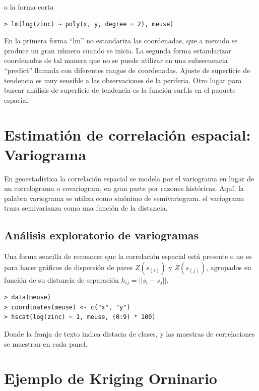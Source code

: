 o la forma corta
\\
\begin{lstlisting}
> lm(log(zinc) ~ poly(x, y, degree = 2), meuse)
\end{lstlisting}

En la primera forma ``lm'' no estandariza las coordenadas, que a menudo se produce un gran número cuando se inicia. La 
segunda forma estandarizar coordenadas de tal manera que no se puede utilizar en una subsecuencia ``predict'' llamada 
con diferentes rangos de coordenadas. Ajuste de superficie de tendencia es muy sensible a las observaciones 
de la periferia. Otro lugar para buscar análisis de superficie de tendencia es la función surf.ls en el paquete espacial.

\section{Estimatión de correlación espacial: Variograma}

En geoestadística la correlación espacial se modela por el variograma en lugar de
un correlograma o covariogram, en gran parte por razones históricas. Aquí, la palabra
variograma se utiliza como sinónimo de semivariogram. el variograma traza semivarianza como una función de la distancia.

\subsection{Análisis exploratorio de variogramas}

Una forma sencilla de reconocer que la correlación espacial está presente o no es
para hacer gráficos de dispersión de pares $Z(s_{(i)})$ y $Z(s_{(j)})$, agrupados en función de su
distancia de separación $h_{ij} = || s_i - s_j ||$.
\\
\begin{lstlisting}
> data(meuse)
> coordinates(meuse) <- c("x", "y")
> hscat(log(zinc) ~ 1, meuse, (0:9) * 100)
\end{lstlisting}

Donde la franja de texto indica distacia de clases, y las muestras de correlaciones se muestran en cada panel.

\section{Ejemplo de Kriging Orninario}

